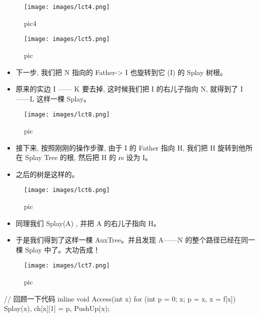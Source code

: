 \begin{figure}[h]
\centering
\texttt{[image: images/lct4.png]} 
\caption{pic4}
\end{figure}

\begin{figure}[h]
\centering
\texttt{[image: images/lct5.png]} 
\caption{pic}
\end{figure}

\begin{itemize}
\item 下一步, 我们把 N 指向的 Father-> I 也旋转到它 (I) 的 Splay 树根。
\item 原来的实边 I —— K 要去掉, 这时候我们把 I 的右儿子指向 N, 就得到了 I——L 这样一棵 Splay。
\end{itemize}

\begin{figure}[h]
\centering
\texttt{[image: images/lct8.png]} 
\caption{pic}
\end{figure}

\begin{itemize}
\item 接下来, 按照刚刚的操作步骤, 由于 I 的 Father 指向 H, 我们把 H 旋转到他所在 Splay Tree 的根, 然后把 H 的 rs 设为 I。
\item 之后的树是这样的。
\end{itemize}

\begin{figure}[h]
\centering
\texttt{[image: images/lct6.png]} 
\caption{pic}
\end{figure}

\begin{itemize}
\item 同理我们 Splay(A) , 并把 A 的右儿子指向 H。
\item 于是我们得到了这样一棵 AuxTree。并且发现 A——N 的整个路径已经在同一棵 Splay 中了。大功告成！
\end{itemize}

\begin{figure}[h]
\centering
\texttt{[image: images/lct7.png]} 
\caption{pic}
\end{figure}

\begin{cppcode}
// 回顾一下代码
inline void Access(int x) {
  for (int p = 0; x; p = x, x = f[x]) {
    Splay(x), ch[x][1] = p, PushUp(x);
  }
}
\end{cppcode}

